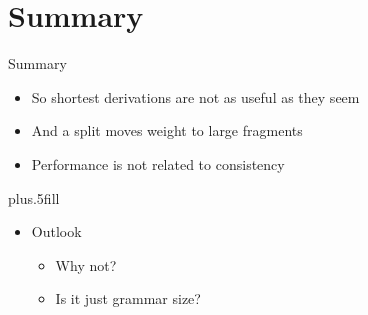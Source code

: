 \documentclass{beamer}
\begin{document}
\section*{Summary}

\begin{frame}{Summary}

  \begin{itemize}
  \item
    So \alert{shortest derivations} are not as useful as they seem
  \item
    And a \alert{split} moves weight to large fragments
  \item
    \alert{Performance} is not related to \alert{consistency}
  \end{itemize}
  
  \vskip0pt plus.5fill
  \begin{itemize}
  \item
    Outlook
    \begin{itemize}
    \item
      Why not?
    \item
      Is it just grammar size?
    \end{itemize}
  \end{itemize}
\end{frame}





%
%
%
%    
%    

 
    

\end{document}

